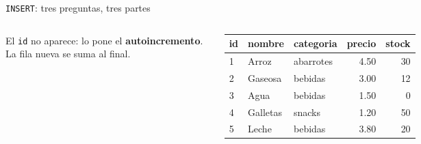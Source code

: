 \documentclass[aspectratio=169,10pt,c]{beamer}
\newcommand{\kw}[1]{\textcolor{utpRojo}{\textbf{#1}}}
\newcommand{\nuevo}[1]{{%
  \setlength{\fboxsep}{1.2pt}%
  \begingroup
  \renewcommand{\kw}[1]{\textcolor{utpNegro}{\textbf{##1}}}%
  \colorbox{yellow!45}{\textcolor{utpNegro}{#1}}%
  \endgroup}}
\newcommand{\pieza}[3]{%
  \node[pieza] at (0,#1) {#2};
  \node[para] at (8.6,#1) {\textcolor{utpRojo}{$\blacktriangleleft$}\ #3};}
\newcommand{\cabproducto}{%
  \normalfont\bfseries id & \normalfont\bfseries nombre & \normalfont\bfseries categoria
  & \normalfont\bfseries precio & \normalfont\bfseries stock \\}
\begin{document}
\begin{frame}{\texttt{INSERT}: tres preguntas, tres partes}
\begin{center}
\end{center}
\vspace{0.3cm}
\begin{columns}[c,onlytextwidth]
\small El \texttt{id} no aparece: lo pone el \textbf{autoincremento}. La fila nueva se suma al final.
\centering\scriptsize\ttfamily
\begin{tabular}{lllrr}
\toprule
\cabproducto
\midrule
1 & Arroz & abarrotes & 4.50 & 30 \\
2 & Gaseosa & bebidas & 3.00 & 12 \\
3 & Agua & bebidas & 1.50 & 0 \\
4 & Galletas & snacks & 1.20 & 50 \\
\nuevo{5} & \nuevo{Leche} & \nuevo{bebidas} & \nuevo{3.80} & \nuevo{20} \\
\bottomrule
\end{tabular}
\end{columns}
\end{frame}
\end{document}
